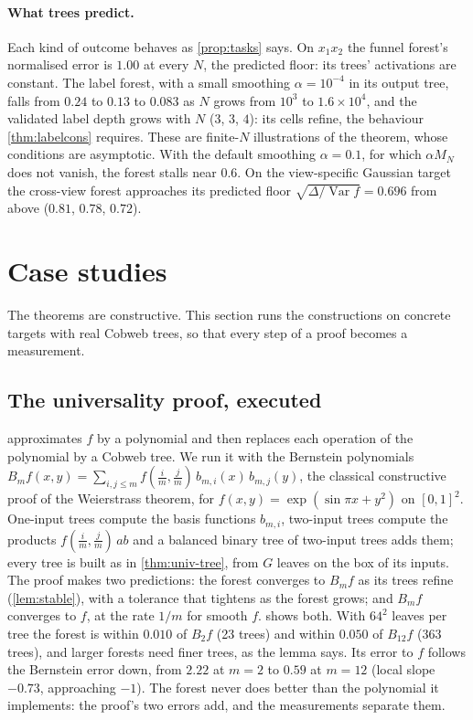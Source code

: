 \documentclass[11pt]{article}
\theoremstyle{definition}
\theoremstyle{remark}
\newcommand{\Var}{\operatorname{Var}}
\begin{document}
\paragraph{What trees predict.}
Each kind of outcome behaves as \cref{prop:tasks} says.  On $x_1x_2$ the funnel forest's
normalised error is $1.00$ at every $N$, the predicted floor: its trees' activations are
constant.  The label forest, with a small smoothing $\alpha=10^{-4}$ in its output tree, falls from
$0.24$ to $0.13$ to $0.083$ as $N$ grows from $10^3$ to $1.6\times10^4$, and the validated label
depth grows with $N$ ($3$, $3$, $4$): its cells refine, the behaviour \cref{thm:labelcons}
requires.  These are finite-$N$ illustrations of the theorem, whose conditions are
asymptotic.  With the default smoothing $\alpha=0.1$, for which $\alpha M_N$ does not vanish,
the forest stalls near $0.6$.  On the
view-specific Gaussian target the cross-view forest approaches its predicted floor
$\sqrt{\Delta/\Var f}=0.696$ from above ($0.81$, $0.78$, $0.72$).

\section{Case studies}\label{sec:cases}

The theorems are constructive.  This section runs the constructions on concrete targets with
real Cobweb trees, so that every step of a proof becomes a measurement.

\subsection{The universality proof, executed}

 approximates $f$ by a polynomial and then replaces each operation of
the polynomial by a Cobweb tree.  We run it with the Bernstein polynomials
$B_mf(x,y)=\sum_{i,j\le m}f(\tfrac im,\tfrac jm)\,b_{m,i}(x)\,b_{m,j}(y)$, the classical constructive
proof of the Weierstrass theorem, for $f(x,y)=\exp(\sin\pi x+y^2)$ on $[0,1]^2$.  One-input trees
compute the basis functions $b_{m,i}$, two-input trees compute the products
$f(\tfrac im,\tfrac jm)\,ab$ and a balanced binary tree of two-input trees adds them; every tree is
built as in \cref{thm:univ-tree}, from $G$ leaves on the box of its inputs.  The proof makes
two predictions: the forest converges to $B_mf$ as its trees refine (\cref{lem:stable}), with
a tolerance that tightens as the forest grows; and $B_mf$ converges to $f$, at the rate $1/m$
for smooth $f$.   shows both.  With $64^2$ leaves per tree the forest is
within $0.010$ of $B_2f$ (23 trees) and within $0.050$ of $B_{12}f$ (363 trees), and larger
forests need finer trees, as the lemma says.  Its error to $f$ follows the Bernstein error
down, from $2.22$ at $m=2$ to $0.59$ at $m=12$ (local slope $-0.73$, approaching $-1$).  The
forest never does better than the polynomial it implements: the proof's two errors add, and
the measurements separate them.
\end{document}
